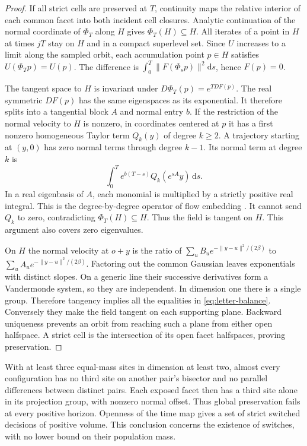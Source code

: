 \documentclass[final,5p,twocolumn]{elsarticle}
\newcommand{\dd}{\mathrm{d}}
\begin{document}
\begin{proof}
If all strict cells are preserved at $T$, continuity maps the
relative interior of each common facet into both incident cell
closures. Analytic continuation of the normal coordinate of $\Phi_T$
along $H$ gives $\Phi_T(H)\subseteq H$. All iterates of a point in
$H$ at times $jT$ stay on $H$ and in a compact superlevel set.
Since $U$ increases to a limit along the sampled orbit, each
accumulation point $p\in H$ satisfies $U(\Phi_Tp)=U(p)$. The
difference is $\int_0^T\|F(\Phi_s p)\|^2\dd s$, hence $F(p)=0$.

The tangent space to $H$ is invariant under $D\Phi_T(p)=e^{TDF(p)}$.
The real symmetric $DF(p)$ has the same eigenspaces as its exponential.
It therefore splits into a tangential block $A$ and normal entry $b$.
If the restriction of the normal velocity to $H$ is nonzero, in
coordinates centered at $p$ it has a first nonzero homogeneous Taylor
term $Q_k(y)$ of degree $k\ge2$. A trajectory starting at $(y,0)$
has zero normal terms through degree $k-1$. Its normal term at
degree $k$ is
\[
 \int_0^T e^{b(T-s)}Q_k(e^{sA}y)\,\dd s .
\]
In a real eigenbasis of $A$, each monomial is multiplied by a
strictly positive real integral. This is the degree-by-degree operator
of flow embedding \cite{zhang,ribon}. It cannot send $Q_k$ to zero,
contradicting $\Phi_T(H)\subseteq H$. Thus the field is tangent on
$H$. This argument also covers zero eigenvalues.

On $H$ the normal velocity at $o+y$ is the ratio of
$\sum_u B_u e^{-\|y-u\|^2/(2\beta)}$ to
$\sum_u A_u e^{-\|y-u\|^2/(2\beta)}$. Factoring out the common
Gaussian leaves exponentials with distinct slopes. On a generic
line their successive derivatives form a Vandermonde system, so
they are independent. In dimension one there is a single group.
Therefore tangency implies all the
equalities in \eqref{eq:letter-balance}. Conversely they make the field
tangent on each supporting plane. Backward uniqueness prevents an orbit
from reaching such a plane from either open halfspace. A strict cell is
the intersection of its open facet halfspaces, proving preservation.
\end{proof}

With at least three equal-mass sites in dimension at least two,
almost every configuration has no third site on another pair's
bisector and no parallel differences between distinct pairs.
Each exposed facet then has a third site alone in its projection
group, with nonzero normal offset. Thus global preservation fails
at every positive horizon. Openness of the time map gives a set of
strict switched decisions of positive volume. This conclusion
concerns the existence of switches, with no lower bound on their
population mass.
\end{document}
